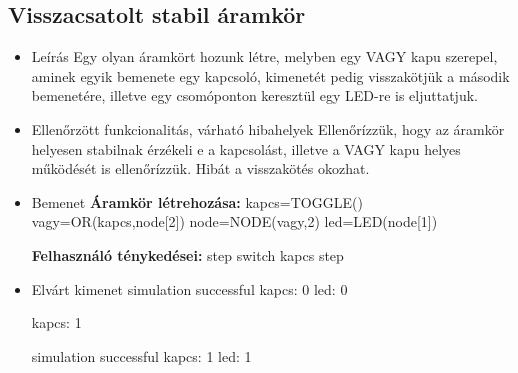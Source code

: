\subsection{Visszacsatolt stabil áramkör}
\begin{itemize}
\item Leírás\newline
Egy olyan áramkört hozunk létre, melyben egy VAGY kapu szerepel, aminek egyik bemenete egy kapcsoló, kimenetét pedig visszakötjük a második bemenetére, illetve egy csomóponton keresztül egy LED-re is eljuttatjuk.
\item Ellenőrzött funkcionalitás, várható hibahelyek\newline
Ellenőrízzük, hogy az áramkör helyesen stabilnak érzékeli e a kapcsolást, illetve a VAGY kapu helyes működését is ellenőrízzük. Hibát a visszakötés okozhat.
\item Bemenet\newline
\newline
{\bf Áramkör létrehozása:}\newline
kapcs=TOGGLE()\newline
vagy=OR(kapcs,node[2])\newline
node=NODE(vagy,2)\newline
led=LED(node[1])\newline

{\bf Felhasználó ténykedései:}\newline
step\newline
switch kapcs\newline
step

\item Elvárt kimenet\newline
simulation successful\newline
kapcs: 0\newline
led: 0\newline

kapcs: 1\newline

simulation successful\newline
kapcs: 1\newline
led: 1\newline


\end{itemize}



